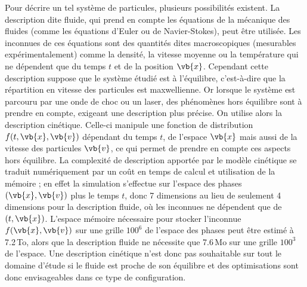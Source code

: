 Pour décrire un tel système de particules, plusieurs possibilités existent. La description dite fluide, qui prend en compte les équations de la mécanique des fluides (comme les équations d’Euler ou de Navier-Stokes), peut être utilisée. Les inconnues de ces équations sont des quantités dites macroscopiques (mesurables expérimentalement) comme la densité, la vitesse moyenne ou la température qui ne dépendent que du temps $t$ et de la position $\vb{x}$. Cependant cette description suppose que le système étudié est à l’équilibre, c’est-à-dire que la répartition en vitesse des particules est maxwellienne. Or lorsque le système est parcouru par une onde de choc ou un laser, des phénomènes hors équilibre sont à prendre en compte, exigeant une description plus précise. On utilise alors la description cinétique. Celle-ci manipule une fonction de distribution $f(t,\vb{x},\vb{v})$ dépendant du temps $t$, de l’espace $\vb{x}$ mais aussi de la vitesse des particules $\vb{v}$, ce qui permet de prendre en compte ces aspects hors équilibre. La complexité de description apportée par le modèle cinétique se traduit numériquement par un coût en temps de calcul et utilisation de la mémoire ; en effet la simulation s’effectue sur l'espace des phases $(\vb{x},\vb{v})$ plus le temps $t$, donc 7 dimensions au lieu de seulement 4 dimensions pour la description fluide, où les inconnues ne dépendent que de $(t,\vb{x})$. L’espace mémoire nécessaire pour stocker l'inconnue $f(\vb{x},\vb{v})$ sur une grille $100^6$ de l’espace des phases peut être estimé à 7.2\,To, alors que la description fluide ne nécessite que 7.6\,Mo sur une grille $100^3$ de l’espace. Une description cinétique n’est donc pas souhaitable sur tout le domaine d’étude si le fluide est proche de son équilibre et des optimisations sont donc envisageables dans ce type de configuration.

